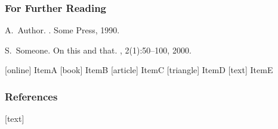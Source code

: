 \documentclass{beamer}
\begin{document}
\begin{frame}[allowframebreaks]
  \frametitle<presentation>{For Further Reading}
    \begin{thebibliography}{10}
        
        \beamertemplatebookbibitems
        
        A.~Author.
        .
        \newblock Some Press, 1990.
        
        
        \beamertemplatearticlebibitems
        
        S.~Someone.
        \newblock On this and that.
        , 2(1):50--100,
        2000.
        
        [online]
         ItemA
        [book]
         ItemB
        [article]
         ItemC
        [triangle]
         ItemD
        [text]
         ItemE
    \end{thebibliography}
\end{frame}

\begin{frame}[t, allowframebreaks]
    \tiny
    \frametitle<presentation>{References}
    [text]
    
    
\end{frame}
\end{document}
